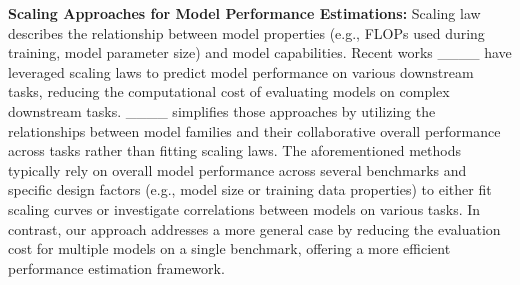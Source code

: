 \textbf{Scaling Approaches for Model Performance Estimations:} 
Scaling law describes the relationship between model properties (e.g., FLOPs used during training, model parameter size) and model capabilities. 
Recent works ____ have leveraged scaling laws to predict model performance on various downstream tasks, reducing the computational cost of evaluating models on complex downstream tasks. ____ simplifies those approaches by utilizing the relationships between model families and their collaborative overall performance across tasks rather than fitting scaling laws. The aforementioned methods typically rely on overall model performance across several benchmarks and specific design factors (e.g., model size or training data properties) to either fit scaling curves or investigate correlations between models on various tasks. In contrast, our approach addresses a more general case by reducing the evaluation cost for multiple models on a single benchmark, offering a more efficient performance estimation framework.

